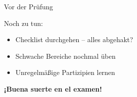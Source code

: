\documentclass[aspectratio=169,11pt]{beamer}
\begin{document}

\begin{frame}{Vor der Prüfung}

\begin{block}{Noch zu tun:}
\begin{itemize}
    \item Checklist durchgehen -- alles abgehakt?
    \item Schwache Bereiche nochmal üben
    \item Unregelmäßige Partizipien lernen
\end{itemize}
\end{block}

\vspace{5mm}

\begin{center}
{\Large\color{spanisch}\textbf{¡Buena suerte en el examen!}}
\end{center}

\end{frame}
\end{document}
